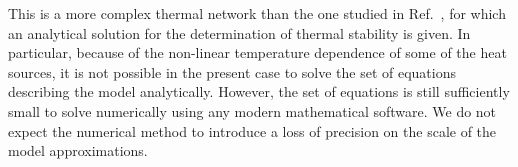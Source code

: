 This is a more complex thermal network than the one studied in Ref.~\cite{Beck:2010zzd}, for which an analytical solution for the determination of thermal stability is given. In particular, because of the non-linear temperature dependence of some of the heat sources, it is not possible in the present case to solve the set of equations describing the model analytically. However, the set of equations is still sufficiently small to solve numerically using any modern mathematical software. We do not expect the numerical method to introduce a loss of precision on the scale of the model approximations.
